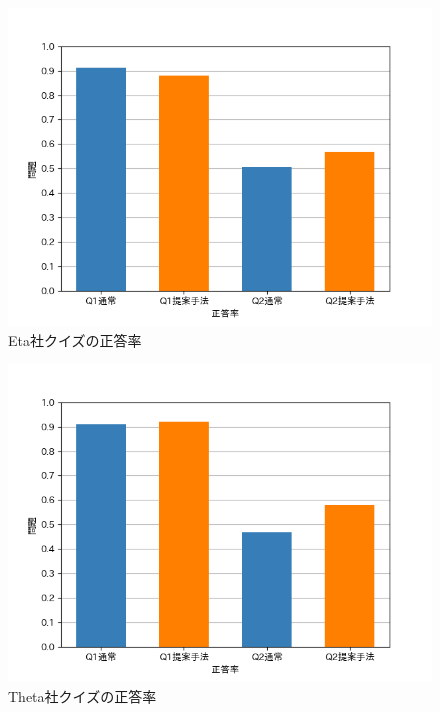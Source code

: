 \begin{figure}[h]
  \begin{center}
      \includegraphics[width=13cm]{img/qgraphEta.png}
      \caption{Eta社クイズの正答率}
      \label{img:Eta社クイズの正答率}
  \end{center}
\end{figure}
\begin{figure}[h]
  \begin{center}
      \includegraphics[width=13cm]{img/qgraphTheta.png}
      \caption{Theta社クイズの正答率}
      \label{img:Theta社クイズの正答率}
  \end{center}
\end{figure}


